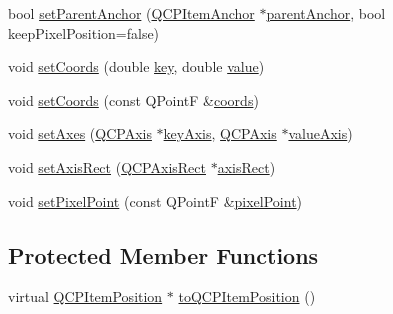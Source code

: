 \begin{DoxyCompactItemize}
\item 
bool \hyperlink{class_q_c_p_item_position_ac094d67a95d2dceafa0d50b9db3a7e51}{set\-Parent\-Anchor} (\hyperlink{class_q_c_p_item_anchor}{Q\-C\-P\-Item\-Anchor} $\ast$\hyperlink{class_q_c_p_item_position_a0db87cc41efabc1cf94acee7ebe14eee}{parent\-Anchor}, bool keep\-Pixel\-Position=false)
\item 
void \hyperlink{class_q_c_p_item_position_aa988ba4e87ab684c9021017dcaba945f}{set\-Coords} (double \hyperlink{class_q_c_p_item_position_ac3cb2bddf5f89e5181830be30b93d090}{key}, double \hyperlink{class_q_c_p_item_position_a6817f7356d3a2b63e8446c6b6106dae1}{value})
\item 
void \hyperlink{class_q_c_p_item_position_acc70b3abc143287f806e5f154e5e07b0}{set\-Coords} (const Q\-Point\-F \&\hyperlink{class_q_c_p_item_position_a253d7adbb6d46299bd6cbc31aa8819f1}{coords})
\item 
void \hyperlink{class_q_c_p_item_position_a2185f45c75ac8cb9be89daeaaad50e37}{set\-Axes} (\hyperlink{class_q_c_p_axis}{Q\-C\-P\-Axis} $\ast$\hyperlink{class_q_c_p_item_position_ab99de7ae5766d246defb2de9f47eaf51}{key\-Axis}, \hyperlink{class_q_c_p_axis}{Q\-C\-P\-Axis} $\ast$\hyperlink{class_q_c_p_item_position_a8d3a039fb2e69df86b4015daa30dfd2d}{value\-Axis})
\item 
void \hyperlink{class_q_c_p_item_position_a0cd9b326fb324710169e92e8ca0041c2}{set\-Axis\-Rect} (\hyperlink{class_q_c_p_axis_rect}{Q\-C\-P\-Axis\-Rect} $\ast$\hyperlink{class_q_c_p_item_position_adf5dfa5007f2a0909e1233bdfcacddfd}{axis\-Rect})
\item 
void \hyperlink{class_q_c_p_item_position_ab404e56d9ac2ac2df0382c57933a71ef}{set\-Pixel\-Point} (const Q\-Point\-F \&\hyperlink{class_q_c_p_item_position_ae490f9c76ee2ba33752c495d3b6e8fb5}{pixel\-Point})
\end{DoxyCompactItemize}
\subsection*{Protected Member Functions}
\begin{DoxyCompactItemize}
\item 
virtual \hyperlink{class_q_c_p_item_position}{Q\-C\-P\-Item\-Position} $\ast$ \hyperlink{class_q_c_p_item_position_a577a7efc601df85a20b3e709d1ac320e}{to\-Q\-C\-P\-Item\-Position} ()
\end{DoxyCompactItemize}
